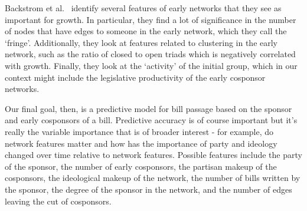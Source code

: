 Backstrom et al.~\cite{Backstrom} identify several features of early networks that they see as important for growth. In particular, they find a lot of significance in the number of nodes that have edges to someone in the early network, which they call the `fringe'. Additionally, they look at features related to clustering in the early network, such as the ratio of closed to open triads which is negatively correlated with growth. Finally, they look at the `activity' of the initial group, which in our context might include the legislative productivity of the early cosponsor networks.

Our final goal, then, is a predictive model for bill passage based on the sponsor and early cosponsors of a bill. Predictive accuracy is of course important but it's really the variable importance that is of broader interest - for example, do network features matter and how has the importance of party and ideology changed over time relative to network features. Possible features include the party of the sponsor, the number of early cosponsors, the partisan makeup of the cosponsors, the ideological makeup of the network, the number of bills written by the sponsor, the degree of the sponsor in the network, and the number of edges leaving the cut of cosponsors.